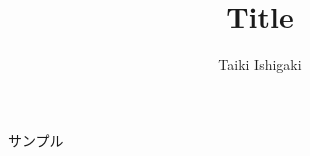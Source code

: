 \documentclass[twocolumn,a4paper]{jsarticle}
\begin{document}
\title{Title}
\author{Taiki Ishigaki}
\date{}

\maketitle
\thispagestyle{empty}
\pagestyle{empty}

サンプル

\footnotesize
\small
% 

\normalsize
\end{document}
